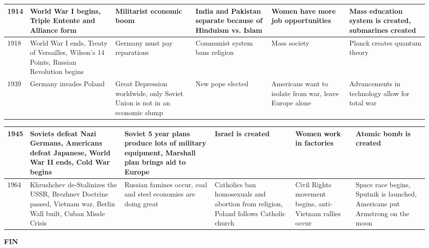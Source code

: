 \documentclass[12pt]{article}
\begin{document}
\begin{enumerate}
\begin{tabular}{|p{}|p{}|p{}|p{}|p{}|p{}|}
\hline
1914 & World War I begins, Triple Entente and Alliance form  & Militarist economic boom  & India and Pakistan separate because of Hinduism vs. Islam  & Women have more job opportunities & Mass education system is created, submarines created \\
\hline
1918 & World War I ends, Treaty of Versailles, Wilson's 14 Points, Russian Revolution begins & Germany must pay reparations  & Communist system bans religion & Mass society &  Planck creates quantum theory \\
\hline
1939 & Germany invades Poland  & Great Depression worldwide, only Soviet Union is not in an economic slump & New pope elected & Americans want to isolate from war, leave Europe alone & Advancements in technology allow for total war  \\
\hline
\end{tabular}
\newpage
\hspace{-40pt} \begin{tabular}{|p{}|p{}|p{}|p{}|p{}|p{}|}
\hline
1945 & Soviets defeat Nazi Germans, Americans defeat Japanese, World War II ends, Cold War begins & Soviet 5 year plans produce lots of military equipment, Marshall plan brings aid to Europe & Israel is created & Women work in factories  & Atomic bomb is created  \\
\hline
1964 & Khrushchev de-Stalinizes the USSR, Brezhnev Doctrine passed, Vietnam war, Berlin Wall built, Cuban Missle Crisis & Russian famines occur, coal and steel economies are doing great & Catholics ban homosexuals and abortion from religion, Poland follows Catholic church & Civil Rights movement begins, anti-Vietnam rallies occur & Space race begins, Sputnik is launched, Americans put Armstrong on the moon \\
\hline



\end{tabular}

\newpage

\centering \huge \textbf{FIN}

\newpage


\end{enumerate}
\end{document}
